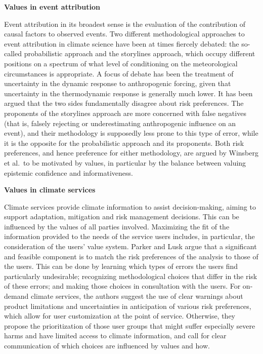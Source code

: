 \documentclass[
]{book}
\begin{document}
\textbf{Values in event attribution}

Event attribution in its broadest sense is the evaluation of the contribution of causal factors to observed events. Two different methodological approaches to event attribution in climate science have been at times fiercely debated: the so-called probabilistic approach and the storylines approach, which occupy different positions on a spectrum of what level of conditioning on the meteorological circumstances is appropriate. A focus of debate has been the treatment of uncertainty in the dynamic response to anthropogenic forcing, given that uncertainty in the thermodynamic response is generally
much lower. It has been argued that the two sides fundamentally disagree about risk preferences. The proponents of the storylines approach are more concerned with false negatives (that is, falsely rejecting or underestimating anthropogenic influence on an event), and their methodology is supposedly less prone to this type of error, while it is the opposite for the probabilistic approach and its proponents. Both risk preferences, and hence preference for either methodology, are argued by Winsberg et al.~to be motivated by values, in particular by the balance between valuing epistemic confidence and informativeness.

\textbf{Values in climate services}

Climate services provide climate information to assist decision-making, aiming to support adaptation, mitigation and risk management decisions. This can be influenced by the values of all parties involved. Maximizing the fit of the information provided to the needs of the service users includes, in particular, the consideration of the users' value system. Parker and Lusk argue that a significant and feasible component is to match the risk preferences of the analysis to those of the users. This can be done by learning which types of errors the users find particularly undesirable;
recognizing methodological choices that differ in the risk of these errors; and making those choices in consultation with the users. For on-demand climate services, the authors suggest the use of clear warnings about product limitations and uncertainties in anticipation of various risk preferences, which allow for user customization at the point of service. Otherwise, they propose the prioritization of those user groups that might suffer especially severe harms and have limited access to climate information, and call for clear communication of which choices are influenced by values and how.
\end{document}
